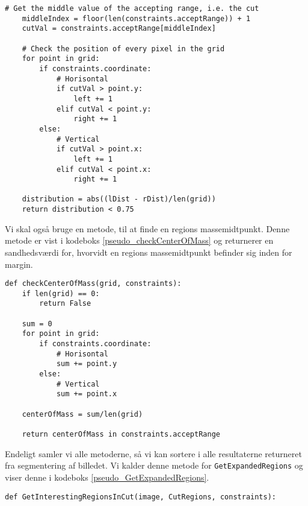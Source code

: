 {\begin{lstlisting}[caption={Metode som, på baggrund af regionens
    fordeling af masse, afgør, om denne region er jævnt fordelt},
    captionpos=b, label={pseudo_distribution}, frame=tb,
    breaklines=false, float=t]
    # Get the middle value of the accepting range, i.e. the cut
    middleIndex = floor(len(constraints.acceptRange)) + 1
    cutVal = constraints.acceptRange[middleIndex]

    # Check the position of every pixel in the grid
    for point in grid:
        if constraints.coordinate:
            # Horisontal
            if cutVal > point.y:
                left += 1
            elif cutVal < point.y:
                right += 1
        else:
            # Vertical
            if cutVal > point.x:
                left += 1
            elif cutVal < point.x:
                right += 1

    distribution = abs((lDist - rDist)/len(grid))
    return distribution < 0.75
\end{lstlisting}

Vi skal også bruge en metode, til at finde en regions massemidtpunkt.
Denne metode er vist i kodeboks \ref{pseudo_checkCenterOfMass} og
returnerer en sandhedsværdi for, hvorvidt en regions massemidtpunkt
befinder sig inden for margin.

\begin{lstlisting}[caption={Metode, som kontrollerer, om en regions
    massemidtpunkt er inden for margin.}, captionpos=b,
    label={pseudo_checkCenterOfMass}, frame=tb, breaklines=false,
    float=t]
def checkCenterOfMass(grid, constraints):
    if len(grid) == 0:
        return False

    sum = 0
    for point in grid:
        if constraints.coordinate:
            # Horisontal
            sum += point.y
        else:
            # Vertical
            sum += point.x

    centerOfMass = sum/len(grid)

    return centerOfMass in constraints.acceptRange
\end{lstlisting}

Endeligt samler vi alle metoderne, så vi kan sortere i alle resultaterne
returneret fra segmentering af billedet. Vi kalder denne metode for
\texttt{GetExpandedRegions} og viser denne i kodeboks
\ref{pseudo_GetExpandedRegions}.

\begin{lstlisting}[caption={Pseudokode, som returnerer alle interessante
    regioner, der er nævnt fordelt over snittet og har et massemidtpunkt
    inden for margin.},
    captionpos=b, label={pseudo_GetExpandedRegions}, frame=tb, breaklines=false,
    float=hb]
def GetInterestingRegionsInCut(image, CutRegions, constraints):


\end{lstlisting}}
